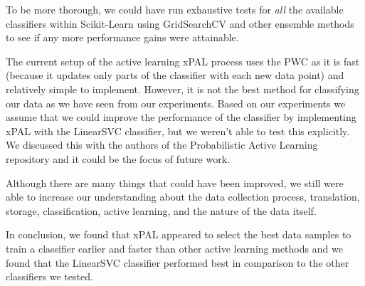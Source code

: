 
To be more thorough, we could have run exhaustive tests for \textit{all} the available classifiers within Scikit-Learn using GridSearchCV and other ensemble methods to see if any more performance gains were attainable. 

The current setup of the active learning xPAL process uses the PWC as it is fast (because it updates only parts of the classifier with each new data point) and relatively simple to implement. However, it is not the best method for classifying our data as we have seen from our experiments. Based on our experiments we assume that we could improve the performance of the classifier by implementing xPAL with the LinearSVC classifier, but we weren't able to test this explicitly. We discussed this with the authors of the Probabilistic Active Learning repository \cite{kottke2021toward} and it could be the focus of future work.

Although there are many things that could have been improved, we still were able to increase our understanding about the data collection process, translation, storage, classification, active learning, and the nature of the data itself. 

In conclusion, we found that xPAL appeared to select the best data samples to train a classifier earlier and faster than other active learning methods and we found that the LinearSVC classifier performed best in comparison to the other classifiers we tested.
